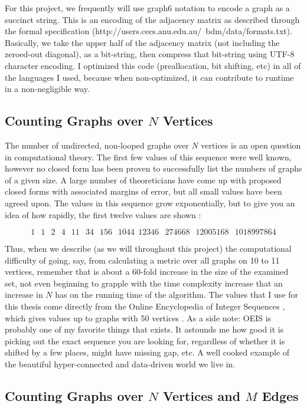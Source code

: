 For this project, we frequently will use graph6 notation to encode a graph as a succinct string.
This is an encoding of the adjacency matrix as described through the formal specification (http://users.cecs.anu.edu.au/~bdm/data/formats.txt).
Basically, we take the upper half of the adjacency matrix (not including the zeroed-out diagonal), as a bit-string, then compress that bit-string using UTF-8 character encoding.
I optimized this code (preallocation, bit shifting, etc) in all of the languages I used, because when non-optimized, it can contribute to runtime in a non-negligible way.

\subsection{Counting Graphs over $N$ Vertices}

The number of undirected, non-looped graphs over $N$ vertices is an open question in computational theory.
The first few values of this sequence were well known, however no closed form has been proven to successfully list the numbers of graphs of a given size.
A large number of theoreticians have come up with proposed closed forms with associated margins of error, but all small values have been agreed upon.
The values in this sequence grow exponentially, but to give you an idea of how rapidly, the first twelve values are shown \cite{oeis}:

$$1\,\; \;1\, \;\;2\, \;\;4\, \;\;11\, \;\;34\, \;\;156\, \;\;1044\,\; 12346\,\;\; 274668\, \;\;12005168\, \;\;1018997864$$

Thus, when we describe (as we will throughout this project) the computational difficulty of going, say, from calculating a metric over all graphs on 10 to 11 vertices, remember that is about a 60-fold increase in the size of the examined set, not even beginning to grapple with the time complexity increase that an increase in $N$ has on the running time of the algorithm.
The values that I use for this thesis come directly from the Online Encyclopedia of Integer Sequences \cite{oeis} , which gives values up to graphs with 50 vertices \cite{oeisbig}.
As a side note: OEIS is probably one of my favorite things that exists.
It astounds me how good it is picking out the exact sequence you are looking for, regardless of whether it is shifted by a few places, might have missing gap, etc.
A well cooked example of the beautiful hyper-connected and data-driven world we live in.

\subsection{Counting Graphs over $N$ Vertices and $M$ Edges}

